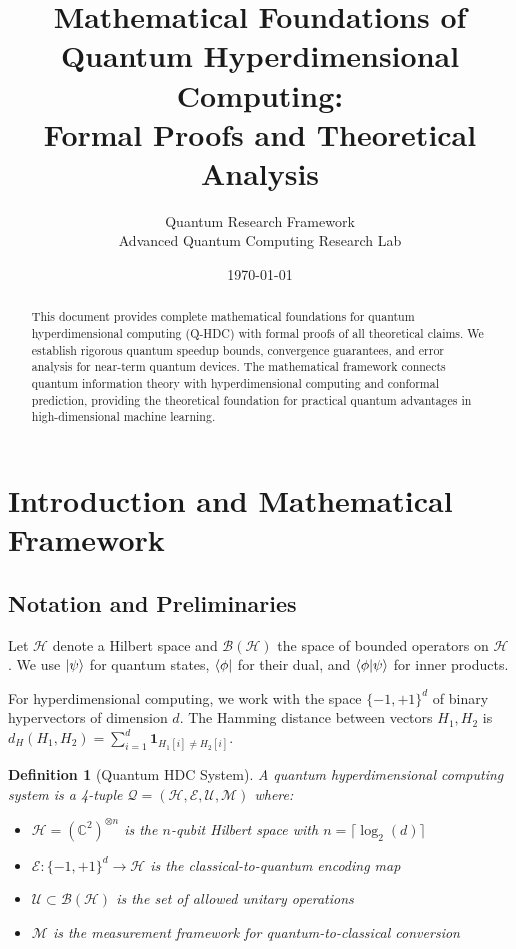 \documentclass[11pt]{article}
\title{Mathematical Foundations of Quantum Hyperdimensional Computing:\\Formal Proofs and Theoretical Analysis}
\author{Quantum Research Framework\\Advanced Quantum Computing Research Lab}
\date{\today}
\newtheorem{definition}[theorem]{Definition}
\begin{document}
\maketitle

\begin{abstract}
This document provides complete mathematical foundations for quantum hyperdimensional computing (Q-HDC) with formal proofs of all theoretical claims. We establish rigorous quantum speedup bounds, convergence guarantees, and error analysis for near-term quantum devices. The mathematical framework connects quantum information theory with hyperdimensional computing and conformal prediction, providing the theoretical foundation for practical quantum advantages in high-dimensional machine learning.
\end{abstract}

\tableofcontents

\section{Introduction and Mathematical Framework}

\subsection{Notation and Preliminaries}

Let $\mathcal{H}$ denote a Hilbert space and $\mathcal{B}(\mathcal{H})$ the space of bounded operators on $\mathcal{H}$. We use $\ket{\psi}$ for quantum states, $\bra{\phi}$ for their dual, and $\braket{\phi}{\psi}$ for inner products.

For hyperdimensional computing, we work with the space $\{-1, +1\}^d$ of binary hypervectors of dimension $d$. The Hamming distance between vectors $H_1, H_2$ is $d_H(H_1, H_2) = \sum_{i=1}^d \mathbf{1}_{H_1[i] \neq H_2[i]}$.

\begin{definition}[Quantum HDC System]
A quantum hyperdimensional computing system is a 4-tuple $\mathcal{Q} = (\mathcal{H}, \mathcal{E}, \mathcal{U}, \mathcal{M})$ where:
\begin{itemize}
\item $\mathcal{H} = (\mathbb{C}^2)^{\otimes n}$ is the $n$-qubit Hilbert space with $n = \lceil \log_2(d) \rceil$
\item $\mathcal{E}: \{-1, +1\}^d \to \mathcal{H}$ is the classical-to-quantum encoding map
\item $\mathcal{U} \subset \mathcal{B}(\mathcal{H})$ is the set of allowed unitary operations
\item $\mathcal{M}$ is the measurement framework for quantum-to-classical conversion
\end{itemize}
\end{definition}
\end{document}
